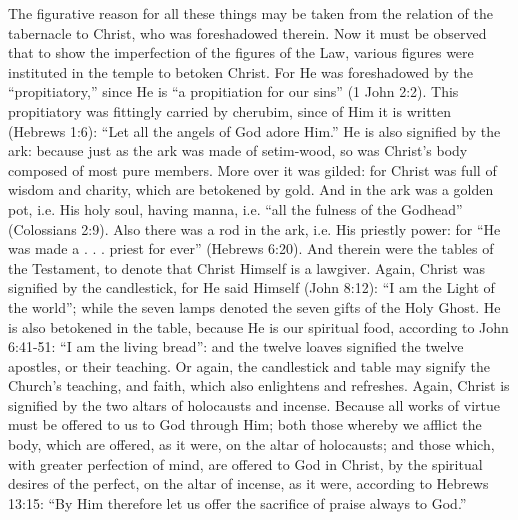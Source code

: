 The figurative reason for all these things may be taken from the relation of the tabernacle to Christ, who was foreshadowed therein. Now it must be observed that to show the imperfection of the figures of the Law, various figures were instituted in the temple to betoken Christ. For He was foreshadowed by the ``propitiatory,'' since He is ``a propitiation for our sins'' (1 John 2:2). This propitiatory was fittingly carried by cherubim, since of Him it is written (Hebrews 1:6): ``Let all the angels of God adore Him.'' He is also signified by the ark: because just as the ark was made of setim-wood, so was Christ's body composed of most pure members. More over it was gilded: for Christ was full of wisdom and charity, which are betokened by gold. And in the ark was a golden pot, i.e. His holy soul, having manna, i.e. ``all the fulness of the Godhead'' (Colossians 2:9). Also there was a rod in the ark, i.e. His priestly power: for ``He was made a . . . priest for ever'' (Hebrews 6:20). And therein were the tables of the Testament, to denote that Christ Himself is a lawgiver. Again, Christ was signified by the candlestick, for He said Himself (John 8:12): ``I am the Light of the world''; while the seven lamps denoted the seven gifts of the Holy Ghost. He is also betokened in the table, because He is our spiritual food, according to John 6:41-51: ``I am the living bread'': and the twelve loaves signified the twelve apostles, or their teaching. Or again, the candlestick and table may signify the Church's teaching, and faith, which also enlightens and refreshes. Again, Christ is signified by the two altars of holocausts and incense. Because all works of virtue must be offered to us to God through Him; both those whereby we afflict the body, which are offered, as it were, on the altar of holocausts; and those which, with greater perfection of mind, are offered to God in Christ, by the spiritual desires of the perfect, on the altar of incense, as it were, according to Hebrews 13:15: ``By Him therefore let us offer the sacrifice of praise always to God.''

